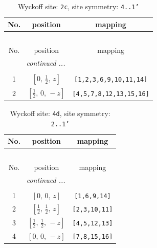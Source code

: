 \documentclass[fleqn,8pt]{jsarticle}
\begin{document}
\renewcommand{\arraystretch}{1.2}
\begin{longtable}{ccc}
\caption{Wyckoff site: {\tt 2c}, site symmetry: {\tt 4..1'}}
 \\
 \hline \hline
No. & position & mapping \\ \hline \endfirsthead

\multicolumn{2}{l}{\tablename\ \thetable{}} \\
 \hline \hline
No. & position & mapping \\ \hline \endhead

 \hline \hline
\multicolumn{2}{r}{\footnotesize\it continued ...} \\ \endfoot

 \hline \hline
\multicolumn{2}{r}{} \\ \endlastfoot

1 & $\left[ 0,\, \frac{1}{2},\, z \right]$ & {\tt [1,2,3,6,9,10,11,14]} \\ \hline
2 & $\left[ \frac{1}{2},\, 0,\, - z \right]$ & {\tt [4,5,7,8,12,13,15,16]} \\
\end{longtable}
\renewcommand{\arraystretch}{1.2}
\begin{longtable}{ccc}
\caption{Wyckoff site: {\tt 4d}, site symmetry: {\tt 2..1'}}
 \\
 \hline \hline
No. & position & mapping \\ \hline \endfirsthead

\multicolumn{2}{l}{\tablename\ \thetable{}} \\
 \hline \hline
No. & position & mapping \\ \hline \endhead

 \hline \hline
\multicolumn{2}{r}{\footnotesize\it continued ...} \\ \endfoot

 \hline \hline
\multicolumn{2}{r}{} \\ \endlastfoot

1 & $\left[ 0,\, 0,\, z \right]$ & {\tt [1,6,9,14]} \\ \hline
2 & $\left[ \frac{1}{2},\, \frac{1}{2},\, z \right]$ & {\tt [2,3,10,11]} \\ \hline
3 & $\left[ \frac{1}{2},\, \frac{1}{2},\, - z \right]$ & {\tt [4,5,12,13]} \\ \hline
4 & $\left[ 0,\, 0,\, - z \right]$ & {\tt [7,8,15,16]} \\
\end{longtable}
\renewcommand{\arraystretch}{1.2}
\end{document}
